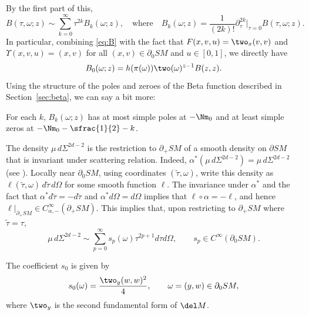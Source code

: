 By the first part of this,
\begin{equation}
B(\tau,\omega; z) \sim \sum_{k=0}^\infty \tau^{2k} B_{k}(\omega; z), \quad \mbox{where}\quad B_k(\omega; z) =
\frac{1}{(2k)!}\partial_\tau^{2k}|_{\tau=0} B(\tau,\omega; z).
\label{eq:Bexpansion}
\end{equation}
In particular, combining \eqref{eq:B} with the fact that $F(x,v,u) = \two_x(v,v)$ and $\Upsilon(x,v,u) = (x,v)$ for all $(x,v)\in \partial_0 SM$ and $u\in [0,1]$, we directly have
\begin{equation*}
B_0(\omega; z) = h(\pi(\omega)) \two(\omega)^{z-1} B(z,z).
\end{equation*}
Using the structure of the poles and zeroes of the Beta function described in Section~\ref{sec:beta}, we can say a bit more:
\begin{Lemma}\label{lem:Bk}
For each $k$, $B_k(\omega; z)$ has at most simple poles at $-\Nm_0$ and at least simple zeros at $-\Nm_0 - \sfrac{1}{2} - k$.
\end{Lemma}

The density $\mu \, d\Sigma^{2d-2}$ is the restriction to $\partial_+ SM$ of a smooth density on $\partial SM$ that is invariant under scattering relation. Indeed, $\alpha^* (\mu \, d\Sigma^{2d-2}) = \mu \, d\Sigma^{2d-2}$ (see \cite[Prop.\,3.6.10]{Paternain2021}).
Locally near $\partial_0 SM$, using coordinates $(\tilde\tau,\omega)$, write this density as $\ell(\tilde\tau, \omega)\,d\tilde\tau\,d\Omega$
for some smooth function $\ell$. The invariance under $\alpha^*$ and the fact that $\alpha^* d\tilde\tau = -d\tilde\tau$ and
$\alpha^* d\Omega = d\Omega$ implies that $\ell\circ \alpha = -\ell$, and hence $\ell|_{\partial_+ SM} \in C_{\alpha,-}^\infty(\partial_+ SM)$. This implies that, upon restricting to $\partial_+ SM$ where $\tilde\tau = \tau$,
\begin{equation}
\mu \, d\Sigma^{2d-2} \sim \sum_{p=0}^\infty s_{p} (\omega) \tau^{2p+1} d\tau d\Omega, \qquad s_{p}\in C^\infty(\partial_0 SM).
\label{eq:musig_expansion}
\end{equation}

\begin{Lemma}\label{lem:s0}
The coefficient $s_0$ is given by
\begin{equation}
s_0(\omega) = \frac{\two_y(w,w)^2}{4}, \qquad \omega = (y,w)\in \partial_0 SM,
\label{eq:s0}
\end{equation}
where $\two_y$ is the second fundamental form of $\del M$.
\end{Lemma}

